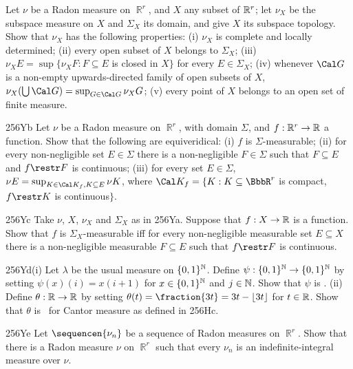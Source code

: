 {
Let $\nu$ be a Radon measure on $\BbbR^r$, and $X$ any subset of $\Bbb
R^r$;  let $\nu_X$ be the subspace measure on $X$ and $\Sigma_X$ its
domain, and give $X$ its
subspace topology.   Show that $\nu_X$ has the following
properties: (i) $\nu_X$ is complete and locally determined;   (ii) every
open subset of $X$ belongs to $\Sigma_X$;  (iii)
$\nu_XE=\sup\{\nu_XF:F\subseteq E$ is closed in $X\}$ for every
$E\in\Sigma_X$;   (iv) whenever $\Cal G$ is a non-empty
upwards-directed family of open subsets of $X$,
$\nu_X(\bigcup\Cal G)=\sup_{G\in\Cal G}\nu_XG$;
(v) every point of $X$ belongs to an open set of finite measure.

\spheader 256Yb Let $\nu$ be a Radon measure on $\BbbR^r$, with domain
$\Sigma$, and $f:\Bbb R^r\to\Bbb R$ a function.   Show that the following
are equiveridical:  (i) $f$ is $\Sigma$-measurable;
(ii) for every non-negligible set
$E\in\Sigma$ there is a non-negligible $F\in\Sigma$  such
that $F\subseteq E$ and $f\restr F$ is continuous;  (iii) for every set
$E\in\Sigma$, $\nu E=\sup_{K\in\Cal K_f,K\subseteq E}\nu K$, where
$\Cal K_f=\{K:K\subseteq\BbbR^r$ is compact, $f\restr K$ is continuous$\}$.

\spheader 256Yc Take $\nu$, $X$, $\nu_X$ and $\Sigma_X$ as in 256Ya.
Suppose that
$f:X\to\Bbb R$ is a function.   Show that $f$ is $\Sigma_X$-measurable
iff for every non-negligible measurable set $E\subseteq X$ there is a
non-negligible measurable $F\subseteq E$ such that $f\restr F$ is
continuous.

\spheader 256Yd(i) Let $\lambda$ be the usual measure on
$\{0,1\}^{\Bbb N}$.   Define $\psi:\{0,1\}^{\Bbb N}\to\{0,1\}^{\Bbb N}$ by
setting $\psi(x)(i)=x(i+1)$ for $x\in\{0,1\}^{\Bbb N}$ and $j\in\Bbb N$.
Show that $\psi$ is \imp.   (ii) Define $\theta:\Bbb R\to\Bbb R$ by setting
$\theta(t)=\fraction{3t}=3t-\lfloor 3t\rfloor$ for $t\in\Bbb R$.
Show that $\theta$ is \imp\ for Cantor measure as defined in 256Hc.

\spheader 256Ye Let $\sequencen{\nu_n}$ be a sequence of Radon measures
on $\BbbR^r$.   Show that there is a Radon measure $\nu$ on $\BbbR^r$
such that every $\nu_n$ is an indefinite-integral measure over $\nu$.

}
